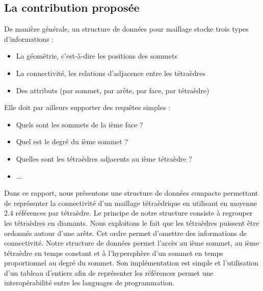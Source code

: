 \subsection*{La contribution proposée}
\noindent
De manière générale, un structure de données pour maillage stocke trois types d'informations :
\begin{itemize}
\item La géométrie, c'est-à-dire les positions des sommets
\item La connectivité, les relations d'adjacence entre les tétraèdres
\item Des attributs (par sommet, par arête, par face, par tétraèdre)\\
\end{itemize}
Elle doit par ailleurs supporter des requêtes simples :
\begin{itemize}
\item Quels sont les sommets de la ième face ?
\item Quel est le degré du ième sommet ?
\item Quelles sont les tétraèdres adjacents au ième tétraèdre ?
\item ...
\end{itemize}
Dans ce rapport, nous présentons une structure de données compacte permettant de représenter la connectivité d'un maillage tétraèdrique en utilisant en moyenne 2.4 références par tétraèdre. Le principe de notre structure consiste à regrouper les tétraèdres en diamants. Nous exploitons le fait que les tétraèdres puissent être ordonnés autour d'une arête. Cet ordre permet d'omettre des informations de connectivité. Notre structure de données permet l'accès au ième sommet, au ième tétraèdre en temps constant et à l'hypersphère d'un sommet en temps proportionnel au degré du sommet. Son implémentation est simple et l'utilisation d'un tableau d'entiers afin de représenter les références permet une interopérabilité entre les languages de programmation.

